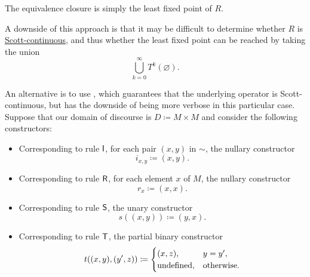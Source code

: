 \begin{example}
  The equivalence closure is simply the least fixed point of \( R \).

  A downside of this approach is that it may be difficult to determine whether \( R \) is \hyperref[def:scott_continuity]{Scott-continuous}, and thus whether the least fixed point can be reached by taking the union
  \begin{equation*}
    \bigcup_{k=0}^\infty T^k(\varnothing).
  \end{equation*}

  An alternative is to use , which guarantees that the underlying operator is Scott-continuous, but has the downside of being more verbose in this particular case. Suppose that our domain of discourse is \( D \coloneqq M \times M \) and consider the following constructors:
  \begin{itemize}
    \item Corresponding to rule \( \textsf{I} \), for each pair \( (x, y) \) in \( {\sim} \), the nullary constructor
    \begin{equation*}
      i_{x,y} \coloneqq (x, y).
    \end{equation*}

    \item Corresponding to rule \( \textsf{R} \), for each element \( x \) of \( M \), the nullary constructor
    \begin{equation*}
      r_x \coloneqq (x, x).
    \end{equation*}

    \item Corresponding to rule \( \textsf{S} \), the unary constructor
    \begin{equation*}
      s((x, y)) \coloneqq (y, x).
    \end{equation*}

    \item Corresponding to rule \( \textsf{T} \), the partial binary constructor
    \begin{equation*}
      t((x, y), (y', z)) \coloneqq \begin{cases}
        (x, z),        &y = y', \\
        \T{undefined}, &\T{otherwise.} \\
      \end{cases}
    \end{equation*}
  \end{itemize}
\end{example}

